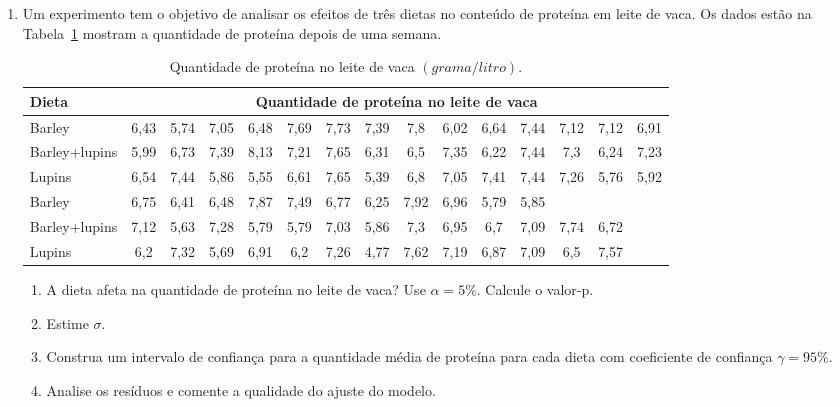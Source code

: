 \documentclass[11pt, a4paper]{article}
\begin{document}
\begin{enumerate}
	\item Um experimento tem o objetivo de analisar os efeitos de três dietas no conteúdo de proteína em leite de vaca. Os dados estão na Tabela~\ref{tab:cow-milk} mostram a quantidade de proteína depois de uma semana.
	\begin{table}[ht]
		\centering
		\begin{tabular}{l|cccccccccccccc}
			\toprule[0.05cm]
			Dieta & \multicolumn{14}{|c}{Quantidade de proteína no leite de vaca} \\
			\midrule[0.025cm]
			Barley & 6,43 & 5,74 & 7,05 & 6,48 & 7,69 & 7,73 & 7,39 & 7,8 & 6,02 & 6,64 & 7,44 & 7,12 & 7,12 & 6,91 \\
			Barley+lupins & 5,99 & 6,73 & 7,39 & 8,13 & 7,21 & 7,65 & 6,31 & 6,5 & 7,35 & 6,22 & 7,44 & 7,3 & 6,24 & 7,23 \\
			Lupins &  6,54 & 7,44 & 5,86 & 5,55 & 6,61 & 7,65 & 5,39 & 6,8 & 7,05 & 7,41 & 7,44 & 7,26 & 5,76 & 5,92   \\ \midrule[0.025cm]
			Barley & 6,75 & 6,41 & 6,48 & 7,87 & 7,49 & 6,77 & 6,25 & 7,92 & 6,96 & 5,79 & 5,85 &   &   &    \\
			Barley+lupins & 7,12 & 5,63 & 7,28 & 5,79 & 5,79 & 7,03 & 5,86 & 7,3 & 6,95 & 6,7 & 7,09 & 7,74 & 6,72 &   \\
			Lupins & 6,2 & 7,32 & 5,69 & 6,91 & 6,2 & 7,26 & 4,77 & 7,62 & 7,19 & 6,87 & 7,09 & 6,5 & 7,57 &    \\
			\bottomrule[0.05cm]
		\end{tabular}
		\caption{Quantidade de proteína no leite de vaca $(grama/litro)$.}
		\label{tab:cow-milk}
	\end{table}
	\begin{enumerate}
		\item A dieta afeta na quantidade de proteína no leite de vaca? Use $\alpha=5\%$. Calcule o valor-p.
		\item Estime $\sigma$.
		\item Construa um intervalo de confiança para a quantidade média de proteína para cada dieta com coeficiente de confiança $\gamma=95\%$.
		\item Analise os resíduos e comente a qualidade do ajuste do modelo.
	\end{enumerate}


\end{enumerate}
\end{document}
